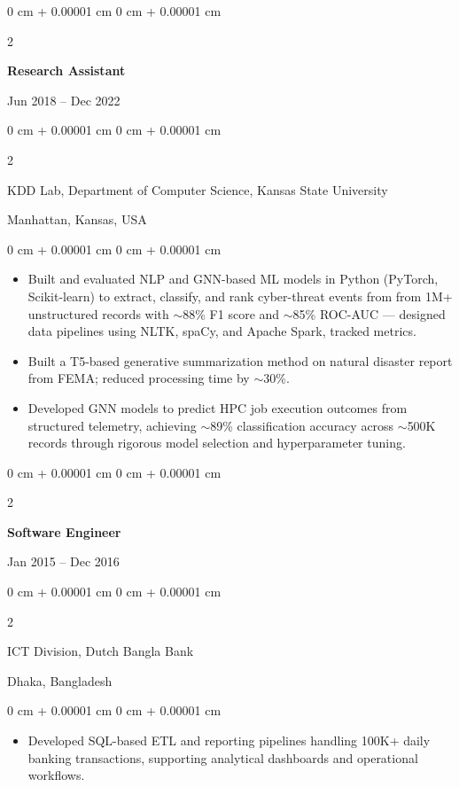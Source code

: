 \documentclass[10pt, letterpaper]{article}
\newenvironment{highlights}{
    \begin{itemize}[
        topsep=0.10 cm,
        parsep=0.10 cm,
        partopsep=0pt,
        itemsep=0pt,
        leftmargin=0 cm + 10pt
    ]
}{
    \end{itemize}
} %
\newenvironment{onecolentry}{
    \begin{adjustwidth}{
        0 cm + 0.00001 cm
    }{
        0 cm + 0.00001 cm
    }
}{
    \end{adjustwidth}
} %
\newenvironment{twocolentry}[2][]{
    \onecolentry
    \def\secondColumn{#2}
    \setcolumnwidth{\fill, 4.5 cm}
    \begin{paracol}{2}
}{
    \switchcolumn \raggedleft \secondColumn
    \end{paracol}
    \endonecolentry
} %
\begin{document}
    \vspace{1mm}

    \begin{twocolentry}{Jun 2018 -- Dec 2022}
        \textbf{Research Assistant}
    \end{twocolentry}
    \begin{twocolentry}{Manhattan, Kansas, USA}
       KDD Lab, Department of Computer Science, Kansas State University
    \end{twocolentry}
    \vspace{0.10 cm}
    \begin{onecolentry}
        \begin{highlights}
            \item Built and evaluated NLP and GNN-based ML models in Python (PyTorch, Scikit-learn) to extract, classify, and rank cyber-threat events from from 1M+ unstructured records with $\sim$88\% F1 score and $\sim$85\% ROC-AUC — designed data pipelines using NLTK, spaCy, and Apache Spark, tracked metrics.
            \item Built a T5-based generative summarization method on natural disaster report from FEMA; reduced processing time by $\sim$30\%.
            \item Developed GNN models to predict HPC job execution outcomes from structured telemetry, achieving $\sim$89\% classification accuracy across $\sim$500K records through rigorous model selection and hyperparameter tuning.
        \end{highlights}
    \end{onecolentry}

    \vspace{0.1 cm}
    \begin{twocolentry}{Jan 2015 -- Dec 2016}
        \textbf{Software Engineer}
    \end{twocolentry}
    \begin{twocolentry}{Dhaka, Bangladesh}
       ICT Division, Dutch Bangla Bank
    \end{twocolentry}

    \begin{onecolentry}
        \begin{highlights}
            \item Developed SQL-based ETL and reporting pipelines handling 100K+ daily banking transactions, supporting analytical dashboards and operational workflows.
        \end{highlights}
    \end{onecolentry}
\end{document}
